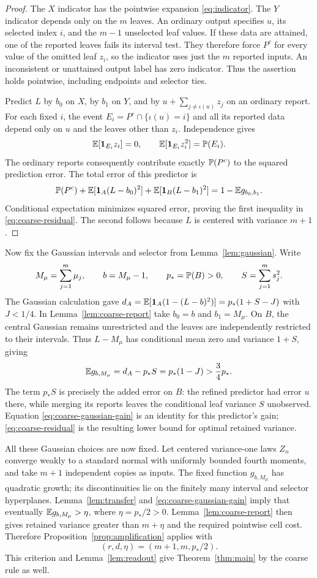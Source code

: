 \begin{proof}
The $X$ indicator has the pointwise expansion \eqref{eq:indicator}.
The $Y$ indicator depends only on the $m$ leaves. An ordinary output
specifies $u$, its selected index $i$, and the $m-1$ unselected leaf
values. If these data are attained, one of the reported leaves fails
its interval test. They therefore force $P^c$ for every value of the
omitted leaf $z_i$, so the indicator uses just the $m$ reported inputs.
An inconsistent or unattained output label has zero indicator. Thus
the assertion holds pointwise, including endpoints and selector ties.

Predict $L$ by $b_0$ on $X$, by $b_1$ on $Y$, and by
$u+\sum_{j\ne\iota(u)}z_j$ on an ordinary report. For each fixed
$i$, the event $E_i=P^c\cap\{\iota(u)=i\}$ and all its reported data
depend only on $u$ and the leaves other than $z_i$. Independence gives
\[
 \mathbb E[\mathbf 1_{E_i}z_i]=0,\qquad
 \mathbb E[\mathbf 1_{E_i}z_i^2]=\mathbb P(E_i).
\]
The ordinary reports consequently contribute exactly $\mathbb P(P^c)$ to
the squared prediction error. The total error of this predictor is
\[
 \mathbb P(P^c)+\mathbb E[\mathbf 1_A(L-b_0)^2]+\mathbb E[\mathbf 1_B(L-b_1)^2]
 =1-\mathbb E g_{b_0,b_1}.
\]
Conditional expectation minimizes squared error, proving the first
inequality in \eqref{eq:coarse-residual}. The second follows because
$L$ is centered with variance $m+1$.
\end{proof}

Now fix the Gaussian intervals and selector from
Lemma~\ref{lem:gaussian}. Write
\[
 M_\mu=\sum_{j=1}^m\mu_j,\qquad b=M_\mu-1,\qquad
 p_*=\mathbb P(B)>0,\qquad S=\sum_{j=1}^m s_j^2.
\]
The Gaussian calculation gave
$d_A=\mathbb E[\mathbf 1_A(1-(L-b)^2)]=p_*(1+S-J)$ with $J<1/4$.
In Lemma~\ref{lem:coarse-report} take $b_0=b$ and $b_1=M_\mu$.
On $B$, the central Gaussian remains unrestricted and the leaves are
independently restricted to their intervals. Thus $L-M_\mu$ has
conditional mean zero and variance $1+S$, giving
\begin{equation}\label{eq:coarse-gaussian-gain}
 \mathbb E g_{b,M_\mu}=d_A-p_*S=p_*(1-J)>\frac34p_*.
\end{equation}
The term $p_*S$ is precisely the added error on $B$: the refined
predictor had error $u$ there, while merging its reports leaves the
conditional leaf variance $S$ unobserved. Equation
\eqref{eq:coarse-gaussian-gain} is an identity for this predictor's
gain; \eqref{eq:coarse-residual} is the resulting lower bound for
optimal retained variance.

All these Gaussian choices are now fixed. Let centered variance-one
laws $Z_n$ converge weakly to a standard normal with uniformly bounded
fourth moments, and take $m+1$ independent copies as inputs. The fixed
function $g_{b,M_\mu}$ has quadratic growth; its discontinuities lie
on the finitely many interval and selector hyperplanes.
Lemma~\ref{lem:transfer} and \eqref{eq:coarse-gaussian-gain} imply
that eventually $\mathbb E g_{b,M_\mu}>\eta$, where $\eta=p_*/2>0$.
Lemma~\ref{lem:coarse-report} then gives retained variance greater
than $m+\eta$ and the required pointwise cell cost. Therefore
Proposition~\ref{prop:amplification} applies with
\[
 (r,d,\eta)=(m+1,m,p_*/2).
\]
This criterion and Lemma~\ref{lem:readout} give
Theorem~\ref{thm:main} by the coarse rule as well.

